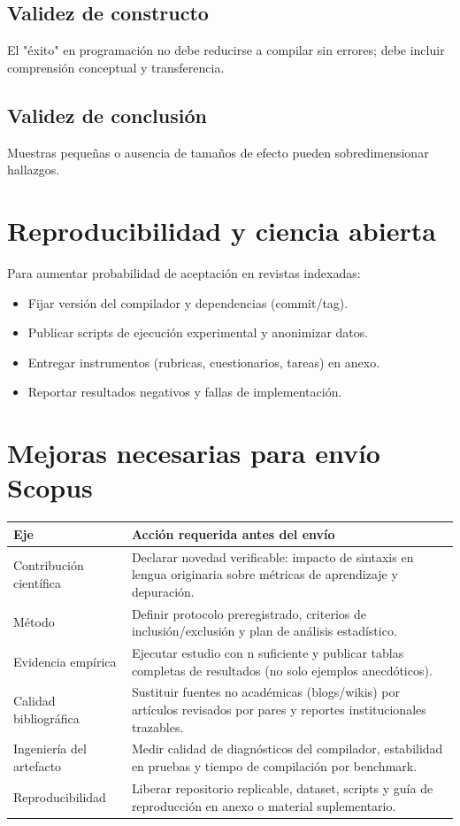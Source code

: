 \documentclass[11pt,a4paper]{article}
\begin{document}
\subsection{Validez de constructo}
El "\'exito" en programaci\'on no debe reducirse a compilar sin errores; debe incluir comprensi\'on conceptual y transferencia.

\subsection{Validez de conclusi\'on}
Muestras peque\~nas o ausencia de tama\~nos de efecto pueden sobredimensionar hallazgos.

\section{Reproducibilidad y ciencia abierta}
Para aumentar probabilidad de aceptaci\'on en revistas indexadas:
\begin{itemize}[leftmargin=*,itemsep=2pt]
  \item Fijar versi\'on del compilador y dependencias (commit/tag).
  \item Publicar scripts de ejecuci\'on experimental y anonimizar datos.
  \item Entregar instrumentos (rubricas, cuestionarios, tareas) en anexo.
  \item Reportar resultados negativos y fallas de implementaci\'on.
\end{itemize}

\section{Mejoras necesarias para env\'io Scopus}
\begin{longtable}{p{} p{}}
\toprule
\textbf{Eje} & \textbf{Acci\'on requerida antes del env\'io} \\
\midrule
Contribuci\'on cient\'ifica & Declarar novedad verificable: impacto de sintaxis en lengua originaria sobre m\'etricas de aprendizaje y depuraci\'on. \\
M\'etodo & Definir protocolo preregistrado, criterios de inclusi\'on/exclusi\'on y plan de an\'alisis estad\'istico. \\
Evidencia emp\'irica & Ejecutar estudio con n suficiente y publicar tablas completas de resultados (no solo ejemplos anecd\'oticos). \\
Calidad bibliogr\'afica & Sustituir fuentes no acad\'emicas (blogs/wikis) por art\'iculos revisados por pares y reportes institucionales trazables. \\
Ingenier\'ia del artefacto & Medir calidad de diagn\'osticos del compilador, estabilidad en pruebas y tiempo de compilaci\'on por benchmark. \\
Reproducibilidad & Liberar repositorio replicable, dataset, scripts y gu\'ia de reproducci\'on en anexo o material suplementario. \\
\bottomrule
\end{longtable}
\end{document}
